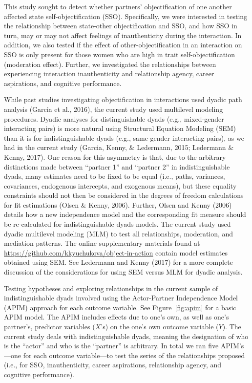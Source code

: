 \documentclass[man]{apa6}
\begin{document}
This study sought to detect whether partners' objectification of one
another affected state self-objectification (SSO). Specifically, we were
interested in testing the relationship between state-other
objectification and SSO, and how SSO in turn, may or may not affect
feelings of inauthenticity during the interaction. In addition, we also
tested if the effect of other-objectification in an interaction on SSO
is only present for those women who are high in trait
self-objectification (moderation effect). Further, we investigated the
relationships between experiencing interaction inauthenticity and
relationship agency, career aspirations, and cognitive performance.

While past studies investigating objectification in interactions used
dyadic path analysis (Garcia et al., 2016), the current study used
multilevel modeling procedures. Dyadic analyses for distinguishable
dyads (e.g., mixed-gender interacting pairs) is more natural using
Structural Equation Modeling (SEM) than it is for indistinguishable
dyads (e.g., same-gender interacting pairs), as we had in the current
study (Garcia, Kenny, \& Ledermann, 2015; Ledermann \& Kenny, 2017). One
reason for this asymmetry is that, due to the arbitrary distinctions
made between \enquote{partner 1} and \enquote{partner 2} in
indistinguishable dyads, many estimates need to be fixed to be equal
(i.e., paths, variances, covariances, endogenous intercepts, and
exogenous means), but these equality constraints should not then be
considered in the degrees of freedom calculations for fit estimations
(Olsen \& Kenny, 2006). Further, Olsen and Kenny (2006) details how a
new independence model and the corresponding fit measure should be
re-calculated for indistinguishable dyads models. The current study used
dyadic multilevel modeling (MLM) to test all relationships, moderation,
and mediation patterns. The online supplementary materials found at
\url{https://github.com/kkyuchukova/object-in-action} contain model
estimates obtained using SEM. See Ledermann and Kenny (2017) for a more
complete discussion of the considerations for using SEM versus MLM for
dyadic analysis.

Testing hypotheses and exploring relationships in the current sample of
indistinguishable dyads involved using the Actor-Partner Independence
Model (APIM) approach for each outcome variable. See
Figure~\ref{fig:apim} for a basic APIM model. The APIM includes effects
due to one's own, as well as one's partner's, predictor variables
(\(X\)'s) on the one's own outcome variable (\(Y\)). The current study
deals with indistinguishable dyads, meaning the designation of who is
the \enquote{actor} and who is the \enquote{partner} is arbitrary. In
total we ran five APIM's---one for each outcome variable---to test the
series of the relationships proposed (i.e., for SSO, inauthenticity,
career aspirations, relationship agency, and cognitive performance).
\end{document}
